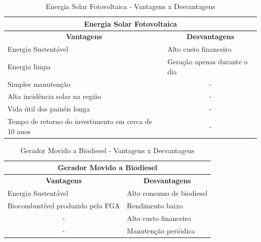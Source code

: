 \begin{table}[h]
  \centering
  \caption{Energia Solar Fotovoltaica - Vantagens x Desvantagens}
  \label{table_solar}
  \begin{tabular}{|l|c|}
    \hline
    \multicolumn{2}{|c|}{\textbf{Energia Solar Fotovoltaica}}                                                \\ \hline
    \multicolumn{1}{|c|}{\textbf{Vantagens}}             & \textbf{Desvantagens}                             \\ \hline
    Energia Sustentável                                  & \multicolumn{1}{l|}{Alto custo financeiro}        \\ \hline
    Energia limpa                                        & \multicolumn{1}{l|}{Geração apenas durante o dia} \\ \hline
    Simples manutenção                                   & -                                                 \\ \hline
    Alta incidência solar na região                      & -                                                 \\ \hline
    Vida útil dos painéis longa                          & -                                                 \\ \hline
    Tempo de retorno do investimento em cerca de 10 anos & -                                                 \\ \hline
  \end{tabular}
\end{table}


\begin{table}[h]
  \centering
  \caption{Gerador Movido a Biodiesel - Vantagens x Desvantagens}
  \label{table_biodiesel}
  \begin{tabular}{|c|l|}
    \hline
    \multicolumn{2}{|c|}{\textbf{Gerador Movido a Biodiesel}}                                            \\ \hline
    \textbf{Vantagens}                                      & \multicolumn{1}{c|}{\textbf{Desvantagens}} \\ \hline
    \multicolumn{1}{|l|}{Energia Sustentável}               & Alto consumo de biodiesel                  \\ \hline
    \multicolumn{1}{|l|}{Biocombustível produzido pela FGA} & Rendimento baixo                           \\ \hline
    -                                                       & Alto custo financeiro                      \\ \hline
    -                                                       & Manutenção periódica                       \\ \hline
  \end{tabular}
\end{table}

